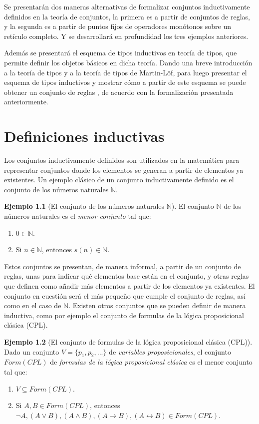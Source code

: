 \documentclass[11pt,oneside]{report}
\theoremstyle{plain}
\theoremstyle{definition}
\newtheorem{ejemplo}{Ejemplo}[chapter]
\newcommand{\N}{\mathbb{N}}
\begin{document}
Se presentarán dos maneras alternativas de formalizar conjuntos inductivamente definidos en la teoría de conjuntos, la primera es a partir de conjuntos de reglas, y la segunda es a partir de puntos fijos de operadores monótonos sobre un retículo completo. Y se desarrollará en profundidad los tres ejemplos anteriores.

Además se presentará el esquema de tipos inductivos en teoría de tipos, que permite definir los objetos básicos en dicha teoría. Dando una breve introducción a la teoría de tipos y a la teoría de tipos de Martin-Löf, para luego presentar el esquema de tipos inductivos y mostrar cómo a partir de este esquema se puede obtener un conjunto de reglas , de acuerdo con la formalización presentada anteriormente.

\chapter{Definiciones inductivas}
Los conjuntos inductivamente definidos son utilizados en la matemática para representar conjuntos donde los elementos se generan a partir de elementos ya existentes. Un ejemplo clásico de un conjunto inductivamente definido es el conjunto de los números naturales $\N$.
\begin{ejemplo} [El conjunto de los números naturales $\N$]
    El conjunto $\N$ de los números naturales es el \emph{menor conjunto} tal que:
    \begin{enumerate}
        \item $0 \in \N$.
        \item Si $n \in \N$, entonces $s(n )\in \N$.
    \end{enumerate}
\end{ejemplo}

Estos conjuntos se presentan, de manera informal, a partir de un conjunto de reglas, unas para indicar qué elementos base están en el conjunto, y otras reglas que definen como añadir más elementos a partir de los elementos ya existentes. El conjunto en cuestión será el más pequeño que cumple el conjunto de reglas, así como en el caso de $\N$. Existen otros conjuntos que se pueden definir de manera inductiva, como por ejemplo el conjunto de formulas de la lógica proposicional clásica (CPL).

\begin{ejemplo}[El conjunto de formulas de la lógica proposicional clásica (CPL)]
    Dado un conjunto $V = \{p_1, p_2,...\}$ de \emph{variables proposicionales}, el conjunto $Form(CPL)$ de \emph{formulas de la lógica proposicional clásica} es el menor conjunto tal que:
    \begin{enumerate}
        \item $V \subseteq Form(CPL)$.
        \item Si $A, B \in Form(CPL)$, entonces $\neg A, (A \lor B), (A \land B), (A \rightarrow B), (A \leftrightarrow B) \in Form(CPL)$.
    \end{enumerate}
\end{ejemplo}
\end{document}
